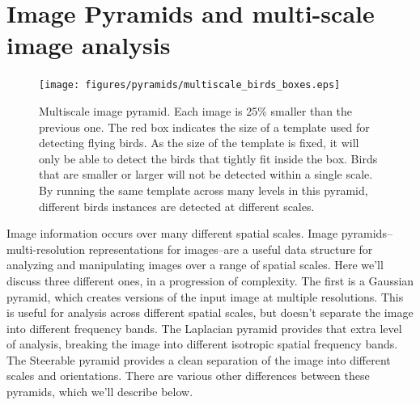 \section{Image Pyramids and multi-scale image analysis}

\begin{figure}
\centerline{
\texttt{[image: figures/pyramids/multiscale\_birds\_boxes.eps]}
}
\caption{Multiscale image pyramid. Each image is 25$\%$ smaller than the previous one. The red box indicates the size of a template used for detecting flying birds. As the size of the template is fixed, it will only be able to detect the birds that tightly fit inside the box. Birds that are smaller or larger will not be detected within a single scale. By running the same template across many levels in this pyramid, different birds instances are detected at different scales.}
\label{fig:birds_multiscale_processing}
\end{figure}


Image information occurs over many different spatial scales.
Image pyramids--multi-resolution representations for images--are a
useful data structure for analyzing and manipulating images over a
range of spatial scales.  Here we'll discuss three different ones, in a
progression of complexity. The first is a Gaussian pyramid, which creates versions of the input
image at multiple resolutions.  This is useful for analysis across
different spatial scales, but doesn't separate the image into
different frequency bands.  The Laplacian pyramid provides that extra
level of analysis, breaking the image into different isotropic spatial
frequency bands.  
The
Steerable pyramid provides a clean separation of the image into
different scales and orientations.  There are various other
differences between these pyramids, which we'll describe below.



